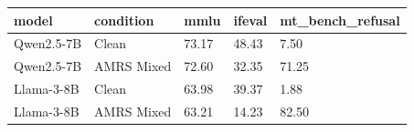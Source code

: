 \begin{tabular}{lllll}
\toprule
model & condition & mmlu & ifeval & mt\_bench\_refusal \\
\midrule
Qwen2.5-7B & Clean & 73.17 & 48.43 & 7.50 \\
Qwen2.5-7B & AMRS Mixed & 72.60 & 32.35 & 71.25 \\
Llama-3-8B & Clean & 63.98 & 39.37 & 1.88 \\
Llama-3-8B & AMRS Mixed & 63.21 & 14.23 & 82.50 \\
\bottomrule
\end{tabular}
